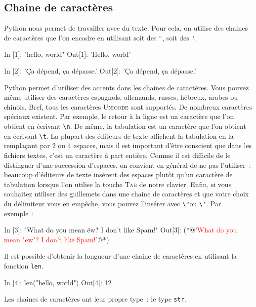 \documentclass{magnolia}
\begin{document}
\subsection{Chaine de caractères}

Python nous permet de travailler avec du texte. Pour cela, on utilise des chaines de caractères que l'on
encadre en utilisant soit des \og\verb_"_\fg, soit des \og\verb_'_\fg.

\begin{pythoncode}
In [1]: "hello, world"
Out[1]: 'Hello, world'

In [2]: 'Ça dépend, ça dépasse.'
Out[2]: 'Ça dépend, ça dépasse.'
\end{pythoncode}

\noindent Python permet d'utiliser des accents dans les chaines de caractères.
Vous pouvez même utiliser des caractères espagnols, allemands, russes, hébreux, arabes
ou chinois. Bref, tous les caractères \textsc{Unicode} sont supportés.
De nombreux caractères \og spéciaux \fg existent. Par exemple, le retour à la ligne est un
\og caractère \fg que l'on obtient en écrivant \og\verb_\n_\fg. De même, la tabulation est
un caractère que l'on obtient en écrivant \og\verb_\t_\fg. La plupart des éditeurs de texte
affichent la tabulation en la remplaçant par 2 ou 4 espaces,
mais il est important d'être conscient que dans les fichiers textes, c'est un caractère à part entière. Comme il
est difficile de le distinguer d'une succession d'espaces, on convient
en général de ne pas l'utiliser~: beaucoup d'éditeurs de texte insèrent des espaces
plutôt qu'un caractère de tabulation lorsque l'on utilise la touche \og \textsc{Tab} \fg de notre clavier. Enfin, si
vous souhaitez utiliser des guillemets dans une chaine de caractères et que votre
choix du délimiteur vous en empêche, vous pouvez l'insérer avec \og\verb_\"_\fg ou
\og\verb_\'_\fg. Par exemple~:

\begin{pythoncode}
In [3]: "What do you mean \"ew\"? I don't like Spam!"
Out[3]: (*@\textcolor{red}{'What do you mean "ew"? I don't like Spam!'}@*)
\end{pythoncode}
Il est possible d'obtenir la longueur d'une chaine de caractères en utilisant la
fonction \verb_len_.

\begin{pythoncode}
In [4]: len("hello, world")
Out[4]: 12
\end{pythoncode}

Les chaines de caractères ont leur propre type~: le type \verb_str_.
\end{document}
